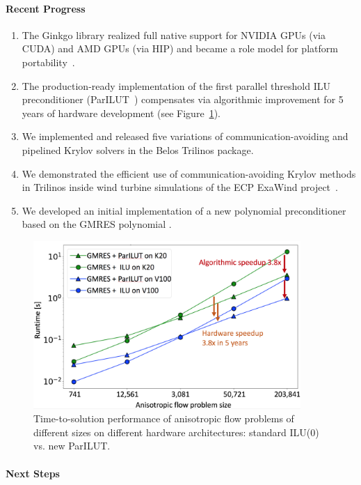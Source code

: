 \paragraph{Recent Progress}
\begin{enumerate}
\item 
The Ginkgo library realized full native support for NVIDIA GPUs (via CUDA) and 
AMD GPUs (via HIP) and became a role model for platform 
portability~\cite{tsai2020preparing}.
\item 
The production-ready implementation of the first parallel threshold ILU 
preconditioner (ParILUT~\cite{ipdps_anzt}) compensates via algorithmic 
improvement for 5 years of hardware development (see 
Figure~\ref{fig:ParILUTperf}).
\item
We implemented and released five variations of communication-avoiding
and pipelined Krylov solvers in the Belos Trilinos package.
\item
We demonstrated the efficient use of communication-avoiding Krylov methods in Trilinos inside wind turbine simulations of the ECP ExaWind 
project~\cite{Yamazaki-lowsynch}.
\item
We developed an initial implementation of a new polynomial preconditioner based on the GMRES polynomial \cite{LoeThornquistBoman20}.
\end{enumerate}

\begin{figure}[htb]
	\centering
	\includegraphics[width=4in]{projects/2.3.3-MathLibs/2.3.3.13-CLOVER/parilut_speedup}
	\caption{\label{fig:ParILUTperf}Time-to-solution performance of anisotropic 
	flow problems of different sizes on different hardware architectures: 
	standard ILU(0) vs. new ParILUT.}
\end{figure}


\paragraph{Next Steps}


